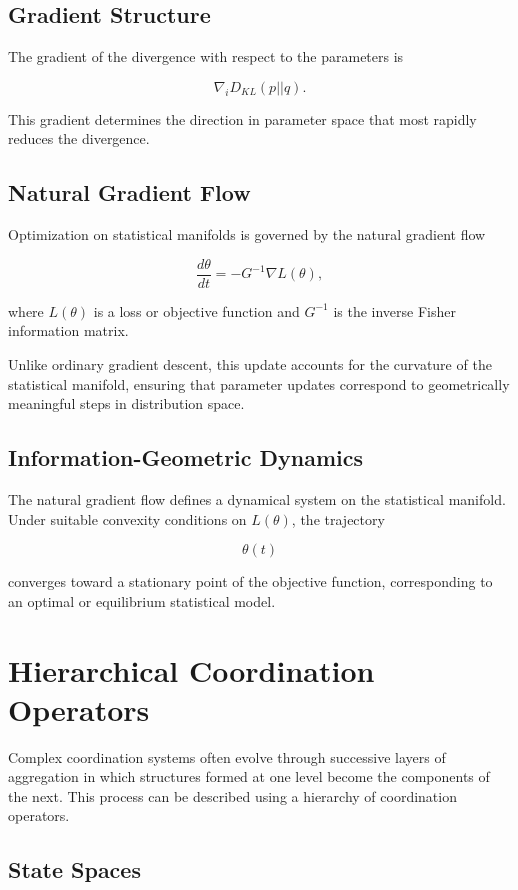 \documentclass[12pt]{article}
\begin{document}
\subsection{Gradient Structure}

The gradient of the divergence with respect to the parameters is

\[
\nabla_i D_{KL}(p||q).
\]

This gradient determines the direction in parameter space that most rapidly reduces the divergence.

\subsection{Natural Gradient Flow}

Optimization on statistical manifolds is governed by the natural gradient flow

\[
\frac{d\theta}{dt} = -G^{-1} \nabla L(\theta),
\]

where $L(\theta)$ is a loss or objective function and $G^{-1}$ is the inverse Fisher information matrix.

Unlike ordinary gradient descent, this update accounts for the curvature of the statistical manifold, ensuring that parameter updates correspond to geometrically meaningful steps in distribution space.

\subsection{Information-Geometric Dynamics}

The natural gradient flow defines a dynamical system on the statistical manifold. Under suitable convexity conditions on $L(\theta)$, the trajectory

\[
\theta(t)
\]

converges toward a stationary point of the objective function, corresponding to an optimal or equilibrium statistical model.

\section{Hierarchical Coordination Operators}

Complex coordination systems often evolve through successive layers of aggregation in which structures formed at one level become the components of the next. This process can be described using a hierarchy of coordination operators.

\subsection{State Spaces}
\end{document}
